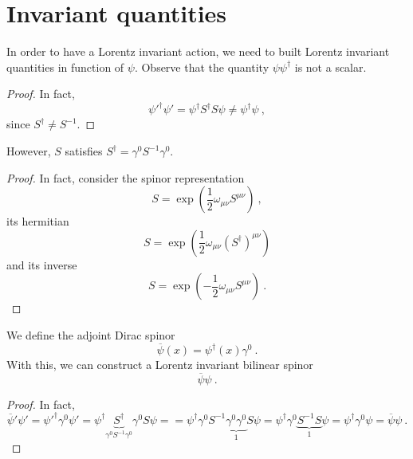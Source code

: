 \section{Invariant quantities}

    In order to have a Lorentz invariant action, we need to built Lorentz invariant quantities in function of $\psi$. Observe that the quantity $\psi \psi^\dagger$ is not a scalar. 
    \begin{proof}
        In fact, 
        \begin{equation*}
            {\psi'}^\dagger \psi' = \psi^\dagger S^\dagger S \psi \neq \psi^\dagger \psi ~,
        \end{equation*}
        since $S^\dagger \neq S^{-1}$.
    \end{proof}

    However, $S$ satisfies $S^\dagger = \gamma^0 S^{-1} \gamma^0$.
    \begin{proof}
        In fact, consider the spinor representation
        \begin{equation*}
            S = \exp ( \frac{1}{2} \omega_{\mu\nu} S^{\mu\nu}) ~,
        \end{equation*}
        its hermitian 
        \begin{equation*}
            S = \exp ( \frac{1}{2} \omega_{\mu\nu} (S^\dagger)^{\mu\nu})
        \end{equation*}
        and its inverse 
        \begin{equation*}
            S = \exp ( - \frac{1}{2} \omega_{\mu\nu} S^{\mu\nu}) ~.
        \end{equation*}
    \end{proof}

    We define the adjoint Dirac spinor 
    \begin{equation*}
        \overline \psi (x) = \psi^\dagger (x) \gamma^0 ~.
    \end{equation*}
    With this, we can construct a Lorentz invariant bilinear spinor 
    \begin{equation*}
        \overline \psi \psi ~.
    \end{equation*}
    \begin{proof}
        In fact, 
        \begin{equation*}
            \overline \psi' \psi' = {\psi'}^\dagger \gamma^0 \psi' = \psi^\dagger \underbrace{S^\dagger}_{\gamma^0 S^{-1} \gamma^0} \gamma^0 S \psi = = \psi^\dagger \gamma^0 S^{-1} \underbrace{\gamma^0 \gamma^0}_1 S \psi = \psi^\dagger \gamma^0 \underbrace{S^{-1} S}_1 \psi = \psi^\dagger \gamma^0 \psi = \overline \psi \psi ~.
        \end{equation*}
    \end{proof}

